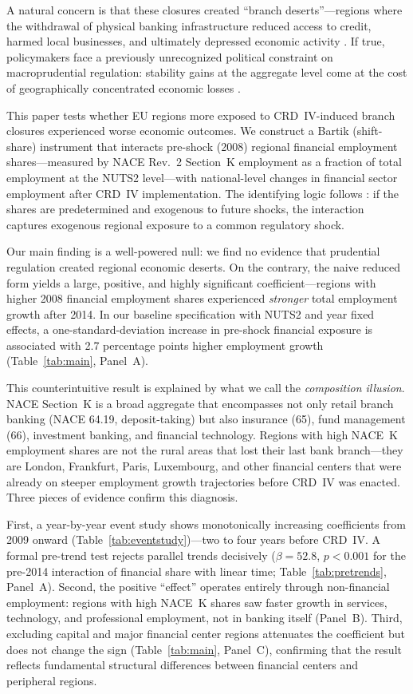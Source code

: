\documentclass[12pt]{article}
\begin{document}
A natural concern is that these closures created ``branch deserts''---regions where the withdrawal of physical banking infrastructure reduced access to credit, harmed local businesses, and ultimately depressed economic activity \citep{nguyen2019branchclosure, cortesiglesias2020branchclosure}. If true, policymakers face a previously unrecognized political constraint on macroprudential regulation: stability gains at the aggregate level come at the cost of geographically concentrated economic losses \citep{dagher2020regulatorycosts}.

This paper tests whether EU regions more exposed to CRD~IV-induced branch closures experienced worse economic outcomes. We construct a Bartik (shift-share) instrument that interacts pre-shock (2008) regional financial employment shares---measured by NACE Rev.~2 Section~K employment as a fraction of total employment at the NUTS2 level---with national-level changes in financial sector employment after CRD~IV implementation. The identifying logic follows \citet{borusyak2022shifshare}: if the shares are predetermined and exogenous to future shocks, the interaction captures exogenous regional exposure to a common regulatory shock.

Our main finding is a well-powered null: we find no evidence that prudential regulation created regional economic deserts. On the contrary, the naive reduced form yields a large, positive, and highly significant coefficient---regions with higher 2008 financial employment shares experienced \emph{stronger} total employment growth after 2014. In our baseline specification with NUTS2 and year fixed effects, a one-standard-deviation increase in pre-shock financial exposure is associated with 2.7 percentage points higher employment growth (Table~\ref{tab:main}, Panel~A).

This counterintuitive result is explained by what we call the \emph{composition illusion}. NACE Section~K is a broad aggregate that encompasses not only retail branch banking (NACE 64.19, deposit-taking) but also insurance (65), fund management (66), investment banking, and financial technology. Regions with high NACE~K employment shares are not the rural areas that lost their last bank branch---they are London, Frankfurt, Paris, Luxembourg, and other financial centers that were already on steeper employment growth trajectories before CRD~IV was enacted. Three pieces of evidence confirm this diagnosis.

First, a year-by-year event study shows monotonically increasing coefficients from 2009 onward (Table~\ref{tab:eventstudy})---two to four years before CRD~IV. A formal pre-trend test rejects parallel trends decisively ($\beta = 52.8$, $p < 0.001$ for the pre-2014 interaction of financial share with linear time; Table~\ref{tab:pretrends}, Panel~A). Second, the positive ``effect'' operates entirely through non-financial employment: regions with high NACE~K shares saw faster growth in services, technology, and professional employment, not in banking itself (Panel~B). Third, excluding capital and major financial center regions attenuates the coefficient but does not change the sign (Table~\ref{tab:main}, Panel~C), confirming that the result reflects fundamental structural differences between financial centers and peripheral regions.
\end{document}
